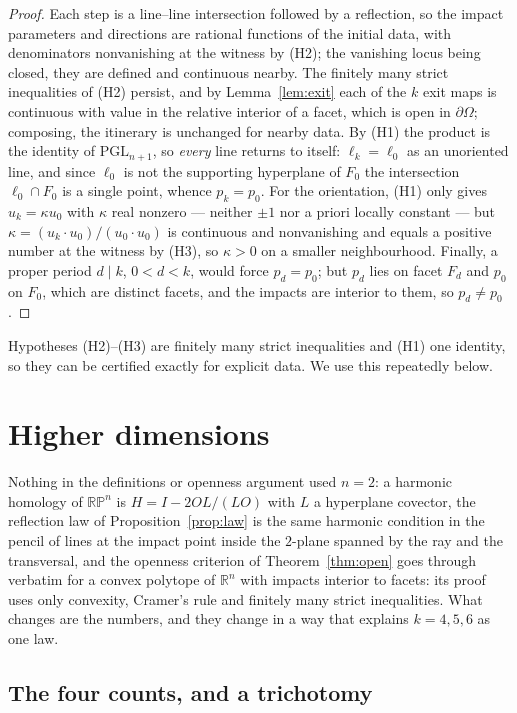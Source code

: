 \documentclass[11pt,a4paper]{article}
\theoremstyle{plain}
\theoremstyle{definition}
\theoremstyle{remark}
\newcommand{\PGL}{\mathrm{PGL}}
\begin{document}
\begin{proof}
Each step is a line--line intersection followed by a reflection, so the impact
parameters and directions are rational functions of the initial data, with
denominators nonvanishing at the witness by (H2); the vanishing locus being closed,
they are defined and continuous nearby. The finitely many strict inequalities of
(H2) persist, and by Lemma~\ref{lem:exit} each of the $k$ exit maps is continuous
with value in the relative interior of a facet, which is open in $\partial\Omega$; composing,
the itinerary is unchanged for nearby data. By (H1) the product is the identity of
$\PGL_{n+1}$, so \emph{every} line returns to itself: $\ell_k=\ell_0$ as an unoriented
line, and since $\ell_0$ is not the supporting hyperplane of $F_0$ the intersection
$\ell_0\cap F_0$ is a single point, whence $p_k=p_0$. For the orientation, (H1)
only gives $u_k=\kappa u_0$ with $\kappa$ real nonzero --- neither $\pm1$ nor a
priori locally constant --- but $\kappa=(u_k\cdot u_0)/(u_0\cdot u_0)$ is
continuous and nonvanishing and equals a positive number at the witness by (H3), so
$\kappa>0$ on a smaller neighbourhood. Finally, a proper period $d\mid k$, $0<d<k$,
would force $p_d=p_0$; but $p_d$ lies on facet $F_d$ and $p_0$ on $F_0$, which are
distinct facets, and the impacts are interior to them, so $p_d\neq p_0$.
\end{proof}

Hypotheses (H2)--(H3) are finitely many strict inequalities and (H1) one identity,
so they can be certified exactly for explicit data. We use this repeatedly
below.
\section{Higher dimensions}\label{sec:higher}

Nothing in the definitions or openness argument used $n=2$: a harmonic
homology of $\mathbb{RP}^n$ is $H=I-2OL/(LO)$ with $L$ a hyperplane covector, the
reflection law of Proposition~\ref{prop:law} is the same harmonic condition in the
pencil of lines at the impact point inside the $2$-plane spanned by the ray and the
transversal, and the openness criterion of Theorem~\ref{thm:open} goes through
verbatim for a convex polytope of $\mathbb{R}^n$ with impacts interior to facets:
its proof uses only convexity, Cramer's rule and finitely many strict
inequalities. What changes are the numbers, and they change in a way that explains
$k=4,5,6$ as one law.

\subsection{The four counts, and a trichotomy}
\end{document}
